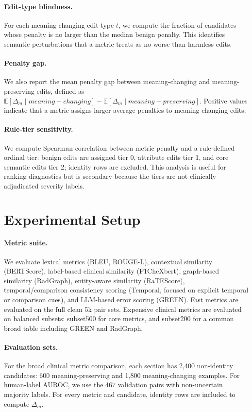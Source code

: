 \documentclass[11pt]{article}
\newcommand{\pres}{meaning-preserving\xspace}
\newcommand{\chg}{meaning-changing\xspace}
\begin{document}
\paragraph{Edit-type blindness.}
For each meaning-changing edit type $t$, we compute the fraction of candidates whose penalty is no larger than the median benign penalty. This identifies semantic perturbations that a metric treats as no worse than harmless edits.

\paragraph{Penalty gap.}
We also report the mean penalty gap between \chg and \pres edits, defined as $\mathbb{E}[\Delta_m \mid \chg] - \mathbb{E}[\Delta_m \mid \pres]$. Positive values indicate that a metric assigns larger average penalties to meaning-changing edits.

\paragraph{Rule-tier sensitivity.}
We compute Spearman correlation between metric penalty and a rule-defined ordinal tier: benign edits are assigned tier 0, attribute edits tier 1, and core semantic edits tier 2; identity rows are excluded. This analysis is useful for ranking diagnostics but is secondary because the tiers are not clinically adjudicated severity labels.

\section{Experimental Setup}

\paragraph{Metric suite.}
We evaluate lexical metrics (BLEU, ROUGE-L), contextual similarity (BERTScore), label-based clinical similarity (F1CheXbert), graph-based similarity (RadGraph), entity-aware similarity (RaTEScore), temporal/comparison consistency scoring (Temporal, focused on explicit temporal or comparison cues), and LLM-based error scoring (GREEN). Fast metrics are evaluated on the full clean 5k pair sets. Expensive clinical metrics are evaluated on balanced subsets: subset500 for core metrics, and subset200 for a common broad table including GREEN and RadGraph.

\paragraph{Evaluation sets.}
For the broad clinical metric comparison, each section has 2,400 non-identity candidates: 600 \pres and 1,800 \chg examples. For human-label AUROC, we use the 467 validation pairs with non-uncertain majority labels. For every metric and candidate, identity rows are included to compute $\Delta_m$.
\end{document}
